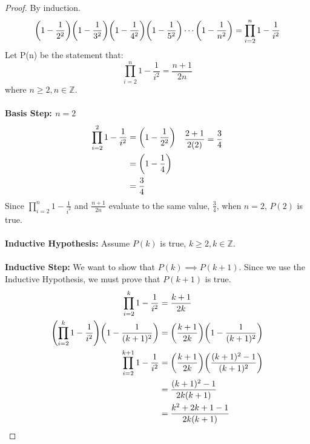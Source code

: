 \documentclass[article, 11pt]{article}
\DeclarePairedDelimiter\paren{(}{)} %
\newcommand{\df}{\displaystyle\frac} %
\newcommand{\ints}{\mathbb{Z}}
\begin{document}
\begin{proof} By induction. \\
    \[ \paren*{1-\df1{2^2}}\paren*{1-\df1{3^2}}\paren*{1-\df1{4^2}}\paren*{1-\df1{5^2}}\cdots \paren*{1-\df1{n^2}} = \prod_{i=2}^{n}{1 - \frac{1}{i^2}} \]
    Let P(n) be the statement that:
    \[ \prod_{i=2}^{n}{1 - \frac{1}{i^2}} = \frac{n+1}{2n}\]
    where $n \geq 2, n \in \ints$. \\
    \\
    \textbf{Basis Step: $n=2$}
    \begin{align*}
        \begin{aligned}
            \prod_{i=2}^{2}{1-\frac{1}{i^2}} &= \paren*{1 - \frac{1}{2^2}} \\
                                         &= \paren*{1 - \frac{1}{4}} \\
                                         &= \frac{3}{4}
        \end{aligned}
        &&
        \begin{aligned}
            \frac{2+1}{2(2)} &= \frac{3}{4} \\
            \\
            \\
            \\
        \end{aligned}
    \end{align*}
    Since $\displaystyle\prod_{i=2}^{n}{1-\frac{1}{i^2}}$ and $\df{n+1}{2n}$ evaluate to the same value, $\df{3}{4}$, when $n=2$, $P(2)$ is true. \\
    \\
    \textbf{Inductive Hypothesis:} Assume $P(k)$ is true, $k \geq 2, k \in \ints$. \\
    \\
    \textbf{Inductive Step:} We want to show that $P(k) \implies P(k+1)$. Since we use the Inductive Hypothesis, we must prove that $P(k+1)$ is true.
    \begin{align*}
        \prod_{i=2}^{k}{1-\frac{1}{i^2}} &= \frac{k+1}{2k} \\
        \paren*{\prod_{i=2}^{k}{1-\frac{1}{i^2}}}\paren*{1-\frac{1}{(k+1)^2}} &= \paren*{\frac{k+1}{2k}}\paren*{1-\frac{1}{(k+1)^2}} \\
        \prod_{i=2}^{k+1}{1-\frac{1}{i^2}} &= \paren*{\frac{k+1}{2k}}\paren*{\frac{(k+1)^2 - 1}{(k+1)^2}} \\
                                           &= \frac{(k+1)^2 - 1}{2k(k+1)} \\
                                           &= \frac{k^2 + 2k + 1 - 1}{2k(k+1)} \\

\end{align*}
\end{proof}
\end{document}
